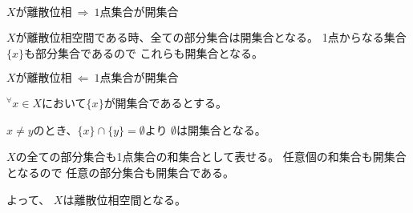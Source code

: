 \documentclass[12pt,b5paper]{ltjsarticle}
\begin{document}
\begin{enumerate}
      \dotfill
      $X \text{が離散位相} \ \Rightarrow \ \text{1点集合が開集合}$
      \dotfill

      $X$が離散位相空間である時、全ての部分集合は開集合となる。
      1点からなる集合$\{x\}$も部分集合であるので
      これらも開集合となる。

      \dotfill
      $X \text{が離散位相} \ \Leftarrow \ \text{1点集合が開集合}$
      \dotfill

      ${}^{\forall}x\in X$において$\{x\}$が開集合であるとする。

      $x\ne y$のとき、$\{x\}\cap\{y\}=\emptyset$より
      $\emptyset$は開集合となる。

      $X$の全ての部分集合も1点集合の和集合として表せる。
      任意個の和集合も開集合となるので
      任意の部分集合も開集合である。

      よって、
      $X$は離散位相空間となる。

\hrulefill

\end{enumerate}

\hrulefill
\end{document}
